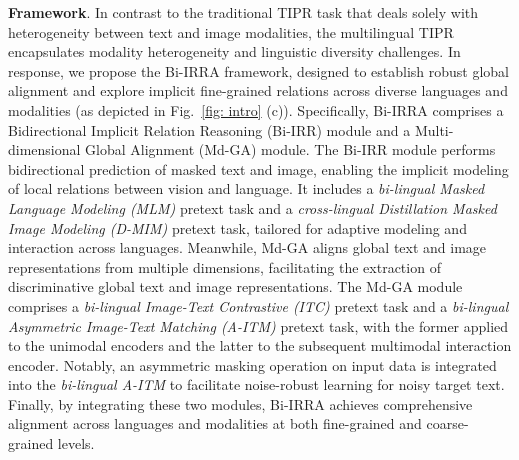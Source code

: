 \documentclass[10pt,journal,compsoc]{IEEEtran}
\begin{document}
\textbf{Framework}. 
In contrast to the traditional TIPR task that deals solely with heterogeneity between text and image modalities, the multilingual TIPR encapsulates modality heterogeneity and linguistic diversity challenges.
In response, we propose the Bi-IRRA framework, designed to establish robust global alignment and explore implicit fine-grained relations across diverse languages and modalities (as depicted in Fig.~\ref{fig: intro} (c)).
Specifically, Bi-IRRA comprises a Bidirectional Implicit Relation Reasoning (Bi-IRR) module and a Multi-dimensional Global Alignment (Md-GA) module.
The Bi-IRR module performs bidirectional prediction of masked text and image, enabling the implicit modeling of local relations between vision and language.
It includes a \emph{bi-lingual Masked Language Modeling (MLM)} pretext task and a \emph{cross-lingual Distillation Masked Image Modeling (D-MIM)} pretext task, tailored for adaptive modeling and interaction across languages.
Meanwhile, Md-GA aligns global text and image representations from multiple dimensions, facilitating the extraction of discriminative global text and image representations.
The Md-GA module comprises a \emph{bi-lingual Image-Text Contrastive (ITC)} pretext task and a \emph{bi-lingual Asymmetric Image-Text Matching (A-ITM)} pretext task, with the former applied to the unimodal encoders and the latter to the subsequent multimodal interaction encoder.
Notably, an asymmetric masking operation on input data is integrated into the \emph{bi-lingual A-ITM} to facilitate noise-robust learning for noisy target text.
Finally, by integrating these two modules, Bi-IRRA achieves comprehensive alignment across languages and modalities at both fine-grained and coarse-grained levels.

\end{document}

